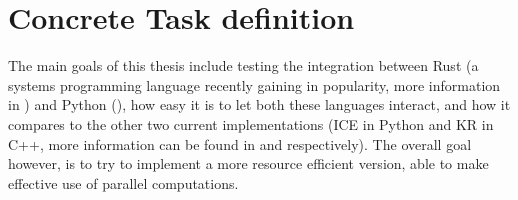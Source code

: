 %
%
%
%
%
%



\section{Concrete Task definition}

The main goals of this thesis include testing the integration between Rust (a
systems programming language recently gaining in popularity, more information
in ) and Python (), how easy it is to
let both these languages interact, and how it compares to the other two current
implementations (ICE in Python and KR in C++, more information can be found in
 and  respectively). The overall goal
however, is to try to implement a more resource efficient version, able to make
effective use of parallel computations.



